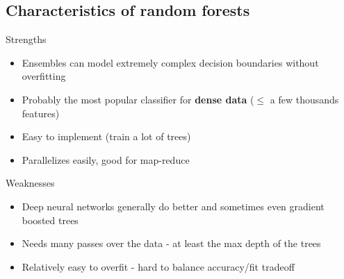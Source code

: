 \subsection{Characteristics of random forests}
Strengths
\begin{itemize}
\item Ensembles can model extremely complex decision boundaries
  without overfitting
\item Probably the most popular classifier for \textbf{dense data} ($
  \leq $ a few thousands features)
\item Easy to implement (train a lot of trees)
\item Parallelizes easily, good for map-reduce
\end{itemize}
Weaknesses
\begin{itemize}
\item Deep neural networks generally do better and sometimes even
  gradient boosted trees
\item Needs many passes over the data - at least the max depth of the
  trees
\item Relatively easy to overfit - hard to balance accuracy/fit
  tradeoff
\end{itemize}

